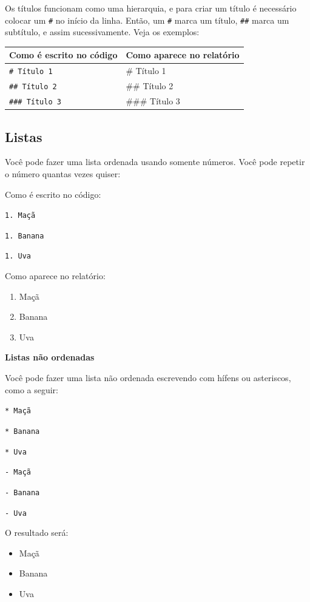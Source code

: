 \documentclass[
]{book}
\providecommand{\tightlist}{%
  \setlength{\itemsep}{0pt}\setlength{\parskip}{0pt}}
\begin{document}
Os títulos funcionam como uma hierarquia, e para criar um título é necessário colocar um \texttt{\#} no início da linha. Então, um \texttt{\#} marca um título, \texttt{\#\#} marca um subtítulo, e assim sucessivamente. Veja os exemplos:

\begin{longtable}[]{@{}ll@{}}
\toprule\noalign{}
Como é escrito no código & Como aparece no relatório \\
\midrule\noalign{}
\endhead
\bottomrule\noalign{}
\endlastfoot
\texttt{\#\ Título\ 1} & \# Título 1 \\
\texttt{\#\#\ Título\ 2} & \#\# Título 2 \\
\texttt{\#\#\#\ Título\ 3} & \#\#\# Título 3 \\
\end{longtable}

\subsection{Listas}\label{listas-1}

Você pode fazer uma lista ordenada usando somente números. Você pode repetir o número quantas vezes quiser:

Como é escrito no código:

\texttt{1.\ Maçã}

\texttt{1.\ Banana}

\texttt{1.\ Uva}

Como aparece no relatório:

\begin{enumerate}
\def\labelenumi{\arabic{enumi}.}
\tightlist
\item
  Maçã
\item
  Banana
\item
  Uva
\end{enumerate}

\textbf{Listas não ordenadas}

Você pode fazer uma lista não ordenada escrevendo com hífens ou asteriscos, como a seguir:

\texttt{*\ Maçã}

\texttt{*\ Banana}

\texttt{*\ Uva}

\texttt{-\ Maçã}

\texttt{-\ Banana}

\texttt{-\ Uva}

O resultado será:

\begin{itemize}
\tightlist
\item
  Maçã
\item
  Banana
\item
  Uva
\end{itemize}
\end{document}
